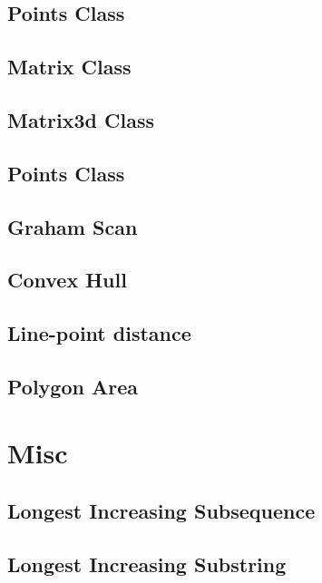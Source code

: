 \documentclass[a4paper]{article}
\begin{document}
\begin{multicols}{3}
\subsection{Points Class}


\subsection{Matrix Class}


\subsection{Matrix3d Class}


\subsection{Points Class}


\subsection{Graham Scan}


\subsection{Convex Hull}


\subsection{Line-point distance}


\subsection{Polygon Area}


\section{Misc}
\subsection{Longest Increasing Subsequence}


\subsection{Longest Increasing Substring}


\end{multicols}
\end{document}
